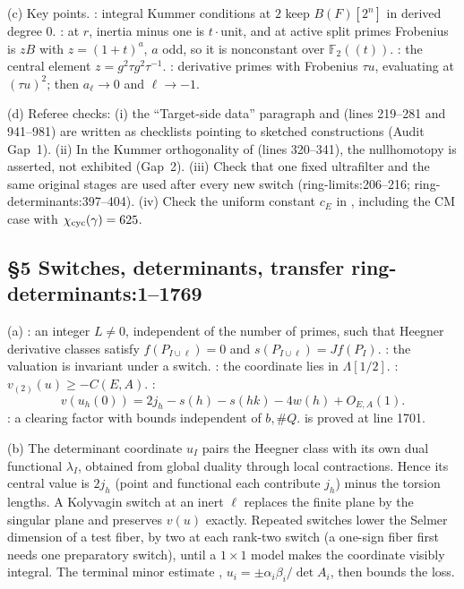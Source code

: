 \documentclass[11pt]{article}
\theoremstyle{remark}
\newcommand{\F}{\mathbb F}
\newcommand{\src}[2]{\textsf{\small #1:#2}}
\begin{document}
(c) Key points. : integral Kummer conditions at $2$ keep
$B(F)[2^n]$ in derived degree $0$. : at $r$, inertia
minus one is $t\cdot$unit, and at active split primes Frobenius is $zB$ with
$z=(1+t)^a$, $a$ odd, so it is nonconstant over $\F_2((t))$.
: the central element $z=g^2\tau g^2\tau^{-1}$.
: derivative primes with Frobenius $\tau u$,
evaluating at $(\tau u)^2$; then $a_\ell\to0$ and $\ell\to-1$.

(d) Referee checks: (i) the ``Target-side data'' paragraph and
 (lines 219--281 and 941--981) are written
as checklists pointing to sketched constructions (Audit Gap~1). (ii) In the
Kummer orthogonality of  (lines 320--341), the nullhomotopy is
asserted, not exhibited (Gap~2). (iii) Check that one fixed ultrafilter and
the same original stages are used after every new switch
(\src{ring-limits}{206--216}; \src{ring-determinants}{397--404}). (iv) Check
the uniform constant $c_E$ in , including the CM case
with $\chi_{\rm cyc}(\gamma)=625$.

\subsection*{\S5 Switches, determinants, transfer \hfill \src{ring-determinants}{1--1769}}
(a) : an integer $L\ne0$, independent of the number of
primes, such that Heegner derivative classes satisfy $f(P_{I\cup\ell})=0$ and
$s(P_{I\cup\ell})=Jf(P_I)$. : the valuation is
invariant under a switch. : the coordinate lies in
$\Lambda[1/2]$. : $v_{(2)}(u)\ge-C(E,A)$.
:
\[
 v(u_h(0))=2j_h-s(h)-s(hk)-4w(h)+O_{E,A}(1).
\]
: a clearing factor with bounds independent of
$b,\#Q$.  is proved at line 1701.

(b) The determinant coordinate $u_I$ pairs the Heegner class with its own
dual functional $\lambda_I$, obtained from global duality through local
contractions. Hence its central value is $2j_h$ (point and functional each
contribute $j_h$) minus the torsion lengths. A Kolyvagin switch at an inert
$\ell$ replaces the finite plane by the singular plane and preserves
$v(u)$ exactly. Repeated switches lower the Selmer dimension of a test fiber,
by two at each rank-two switch (a one-sign fiber first needs one preparatory
switch), until a $1\times1$ model makes the coordinate visibly integral. The terminal minor estimate ,
$u_i=\pm\alpha_i\beta_i/\det A_i$, then bounds the loss.
\end{document}
